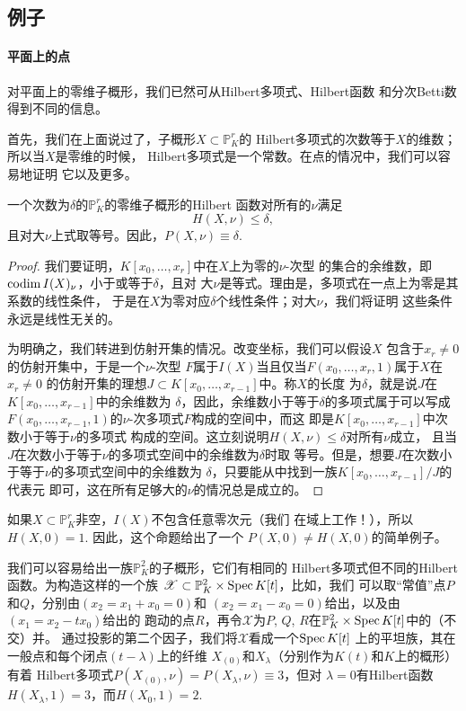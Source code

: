 \subsection{例子}\label{s:3.3.4}
\paragraph*{平面上的点}
对平面上的零维子概形，我们已然可从Hilbert多项式、Hilbert函数
和分次Betti数得到不同的信息。

首先，我们在上面说过了，子概形$X\subset \mathbb P_K^r$的
Hilbert多项式的次数等于$X$的维数；所以当$X$是零维的时候，
Hilbert多项式是一个常数。在点的情况中，我们可以容易地证明
它以及更多。

\begin{pro}\label{pro:3.59}
	一个次数为$\delta$的$\mathbb P_K^r$的零维子概形的Hilbert
	函数对所有的$\nu$满足
	\[H(X,\nu)\leq \delta,\]
	且对大$\nu$上式取等号。因此，$P(X,\nu)\equiv \delta$.
\end{pro}

\begin{proof}
我们要证明，$K[x_0,\dots,x_r]$中在$X$上为零的$\nu$-次型
的集合的余维数，即$\operatorname{codim} I(X)_\nu$，小于或等于$\delta$，且对
大$\nu$是等式。理由是，多项式在一点上为零是其系数的线性条件，
于是在$X$为零对应$\delta$个线性条件；对大$\nu$，我们将证明
这些条件永远是线性无关的。

为明确之，我们转进到仿射开集的情况。改变坐标，我们可以假设$X$
包含于$x_r\neq 0$的仿射开集中，于是一个$\nu$-次型
$F$属于$I(X)$当且仅当$F(x_0,\dots,x_r,1)$属于$X$在$x_r\neq 0$
的仿射开集的理想$J\subset K[x_0,\dots,x_{r-1}]$中。称$X$的长度
为$\delta$，就是说$J$在$K[x_0,\dots,x_{r-1}]$中的余维数为
$\delta$，因此，余维数小于等于$\delta$的多项式属于可以写成
$F(x_0,\dots,x_{r-1},1)$的$\nu$-次多项式$F$构成的空间中，而这
即是$K[x_0,\dots,x_{r-1}]$中次数小于等于$\nu$的多项式
构成的空间。这立刻说明$H(X,\nu)\leq \delta$对所有$\nu$成立，
且当$J$在次数小于等于$\nu$的多项式空间中的余维数为$\delta$时取
等号。但是，想要$J$在次数小于等于$\nu$的多项式空间中的余维数为
$\delta$，只要能从中找到一族$K[x_0,\dots,x_{r-1}]/J$的代表元
即可，这在所有足够大的$\nu$的情况总是成立的。
\end{proof}

如果$X\subset \mathbb P_K^r$非空，$I(X)$不包含任意零次元（我们
在域上工作！），所以$H(X,0)=1$. 因此，这个命题给出了一个
$P(X,0)\neq H(X,0)$的简单例子。

我们可以容易给出一族$\mathbb P_K^2$的子概形，它们有相同的
Hilbert多项式但不同的Hilbert函数。为构造这样的一个族
$\mathscr X\subset \mathbb P_K^2\times \operatorname{Spec} K[t]$，比如，我们
可以取“常值”点$P$和$Q$，分别由$(x_2=x_1+x_0=0)$和
$(x_2=x_1-x_0=0)$给出，以及由$(x_1=x_2-tx_0)$给出的
跑动的点$R$，再令$\mathscr X$为$P$, $Q$, $R$在$\mathbb P_K^2
\times \operatorname{Spec} K[t]$中的（不交）并。
% 
通过投影的第二个因子，我们将$\mathscr X$看成一个$\operatorname{Spec} K[t]$
上的平坦族，其在一般点和每个闭点$(t-\lambda)$上的纤维
$X_{(0)}$和$X_\lambda$（分别作为$K(t)$和$K$上的概形）有着
Hilbert多项式$P(X_{(0)},\nu)=P(X_\lambda,\nu)\equiv 3$，但对
$\lambda =0$有Hilbert函数$H(X_{\lambda},1)=3$，而$H(X_0,1)=2$.

